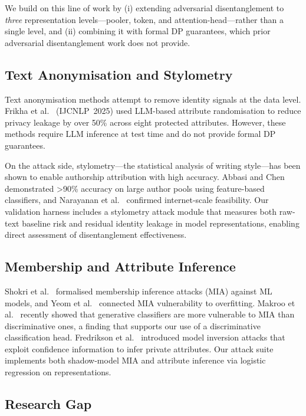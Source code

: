 \documentclass{article}
\begin{document}
We build on this line of work by (i) extending adversarial
disentanglement to \emph{three} representation levels---pooler, token,
and attention-head---rather than a single level, and (ii) combining it
with formal DP guarantees, which prior adversarial disentanglement work
does not provide.

\subsection{Text Anonymisation and Stylometry}

Text anonymisation methods attempt to remove identity signals at the data
level. Frikha et al.~\cite{frikha2025incognitext} (IJCNLP~2025) used
LLM-based attribute randomisation to reduce privacy leakage by over 50\%
across eight protected attributes.
However, these methods require LLM inference at test time and do not
provide formal DP guarantees.

On the attack side, stylometry---the statistical analysis of writing
style---has been shown to enable authorship attribution with high accuracy.
Abbasi and Chen~\cite{abbasi2008writerpints} demonstrated >90\% accuracy
on large author pools using feature-based classifiers, and Narayanan et
al.~\cite{narayanan2012feasibility} confirmed internet-scale feasibility.
Our validation harness includes a stylometry attack module that measures
both raw-text baseline risk and residual identity leakage in model
representations, enabling direct assessment of disentanglement
effectiveness.

\subsection{Membership and Attribute Inference}

Shokri et al.~\cite{shokri2017membership} formalised membership inference
attacks (MIA) against ML models, and Yeom et al.~\cite{yeom2018privacy}
connected MIA vulnerability to overfitting.
Makroo et al.~\cite{makroo2025hidden} recently showed that generative
classifiers are more vulnerable to MIA than discriminative ones, a
finding that supports our use of a discriminative classification head.
Fredrikson et al.~\cite{fredrikson2015model} introduced model inversion
attacks that exploit confidence information to infer private attributes.
Our attack suite implements both shadow-model MIA and attribute inference
via logistic regression on representations.

\subsection{Research Gap}
\end{document}
